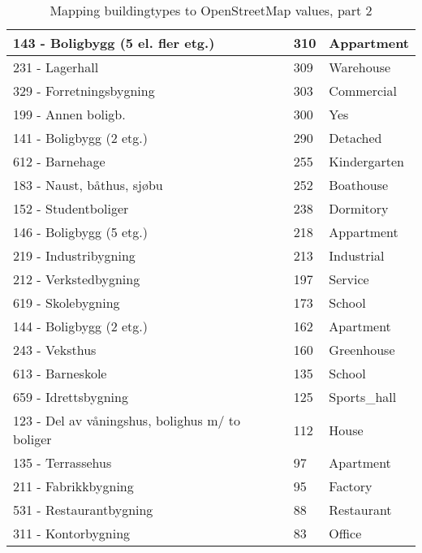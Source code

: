 \begin{table}[H]
\begin{tabular}{ | l | l | l | }
\hline
	143 - Boligbygg (5 el. fler etg.) & 310 & Appartment \\ \hline
	231 - Lagerhall & 309 & Warehouse \\ \hline
	329 - Forretningsbygning & 303 & Commercial \\ \hline
	199 - Annen boligb. & 300 & Yes \\ \hline
	141 - Boligbygg (2 etg.) & 290 & Detached  \\ \hline
	612 - Barnehage & 255 & Kindergarten \\ \hline
	183 - Naust, båthus, sjøbu & 252 & Boathouse \\ \hline
	152 - Studentboliger & 238 & Dormitory \\ \hline
	146 - Boligbygg (5 etg.) & 218 & Appartment \\ \hline
	219 - Industribygning & 213 & Industrial \\ \hline
	212 - Verkstedbygning & 197 & Service  \\ \hline
	619 - Skolebygning & 173 & School \\ \hline
	144 - Boligbygg (2 etg.)  & 162 & Apartment \\ \hline
	243 - Veksthus & 160 & Greenhouse \\ \hline
	613 - Barneskole & 135 & School   \\ \hline
	659 - Idrettsbygning & 125 & Sports\_hall \\ \hline
	123 - Del av våningshus, bolighus m/ to boliger & 112 & House \\ \hline
	135 - Terrassehus & 97 & Apartment \\ \hline
	211 - Fabrikkbygning & 95 & Factory \\ \hline
	531 - Restaurantbygning & 88 & Restaurant \\ \hline
	311 - Kontorbygning & 83 & Office \\ \hline
\end{tabular}
\caption{Mapping buildingtypes to OpenStreetMap values, part 2}
\label{tab:fkbtoosmdel2}
\end{table}

